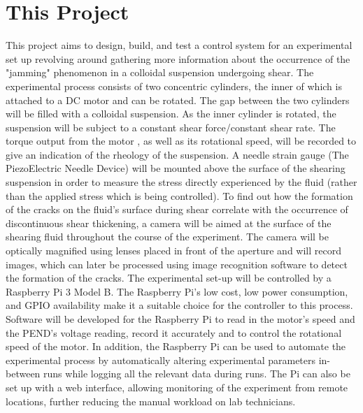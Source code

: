 \documentclass[a4]{report}
\begin{document}
	\section{This Project}
	This project aims to design, build, and test a control system for an experimental set up revolving around gathering more information about the occurrence of the "jamming" phenomenon in a colloidal suspension undergoing shear. The experimental process consists of two concentric cylinders, the inner of which is attached to a DC motor and can be rotated. The gap between the two cylinders will be filled with a colloidal suspension. As the inner cylinder is rotated, the suspension will be subject to a constant shear force/constant shear rate. The torque output from the motor , as well as its rotational speed, will be recorded to give an indication of the rheology of the suspension. A needle strain gauge (The PiezoElectric Needle Device) will be mounted above the surface of the shearing suspension in order to measure the stress directly experienced by the fluid (rather than the applied stress which is being controlled). \newline \newline \noindent
	To find out how the formation of the cracks on the fluid's surface during shear correlate with the occurrence of discontinuous shear thickening, a camera will be aimed at the surface of the shearing fluid throughout the course of the experiment. The camera will be optically magnified using lenses placed in front of the aperture and will record images, which can later be processed using image recognition software to detect the formation of the cracks. \newline \newline \noindent
	The experimental set-up will be controlled by a Raspberry Pi 3 Model B. The Raspberry Pi's low cost, low power consumption, and GPIO availability make it a suitable choice for the controller to this process. Software will be developed for the Raspberry Pi to read in the motor's speed and the PEND's voltage reading, record it accurately and to control the rotational speed of the motor. In addition, the Raspberry Pi can be used to automate the experimental process by automatically altering experimental parameters in-between runs while logging all the relevant data during runs. The Pi can also be set up with a web interface, allowing monitoring of the experiment from remote locations, further reducing the manual workload on lab technicians.
\end{document}
